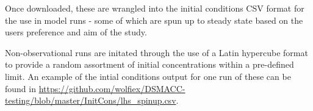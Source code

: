 Once downloaded, these are wrangled into the initial conditions CSV format for the use in model runs - some of which are spun up to steady state based on the users preference and aim of the study.

Non-observational runs are initated through the use of a Latin hypercube format to provide a random assortment of initial concentrations within a pre-defined limit. An example of the intial conditions output for one run of these can be found in \url{https://github.com/wolfiex/DSMACC-testing/blob/master/InitCons/lhs_spinup.csv}.




